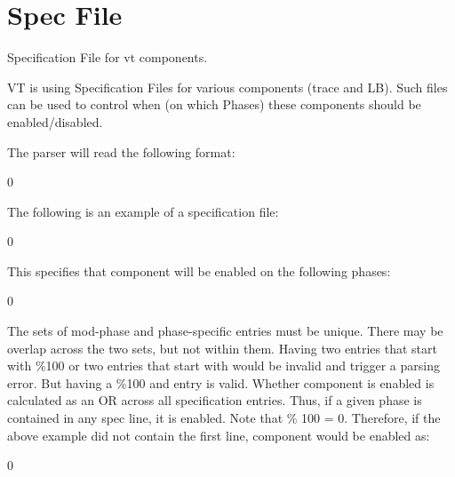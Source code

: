 \chapter{Spec File }
\hypertarget{spec-file}{}\label{spec-file}
Specification File for vt components.

VT is using Specification Files for various components (trace and LB). Such files can be used to control when (on which Phases) these components should be enabled/\+disabled.

The parser will read the following format:\+


\begin{DoxyCode}{0}

\end{DoxyCode}


The following is an example of a specification file:\+


\begin{DoxyCode}{0}

\end{DoxyCode}


This specifies that component will be enabled on the following phases:\+


\begin{DoxyCode}{0}
\DoxyCodeLine{\{}
\DoxyCodeLine{\}}

\end{DoxyCode}


The sets of mod-\/phase and phase-\/specific entries must be unique. There may be overlap across the two sets, but not within them. Having two entries that start with {\ttfamily \%100} or two entries that start with {} would be invalid and trigger a parsing error. But having a {\ttfamily \%100} and {} entry is valid. Whether component is enabled is calculated as an OR across all specification entries. Thus, if a given phase is contained in any spec line, it is enabled. Note that { \% 100 = 0}. Therefore, if the above example did not contain the first line, component would be enabled as:\+


\begin{DoxyCode}{0}
\DoxyCodeLine{\{}
\DoxyCodeLine{\ \ [97,103],}
\DoxyCodeLine{\ \ [195,205],}
\DoxyCodeLine{\}}

\end{DoxyCode}
 